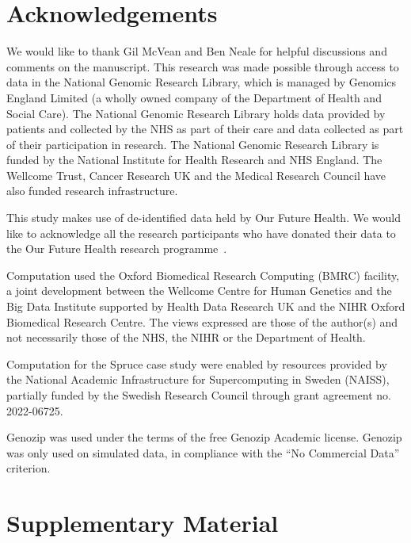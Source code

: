 \documentclass[a4paper,num-refs]{oup-contemporary}
\begin{document}
\section{Acknowledgements}
We would like to thank Gil McVean and Ben Neale for helpful discussions and 
comments on the manuscript.
This research was made possible through access to data in the National Genomic
Research Library, which is managed by Genomics England Limited (a wholly owned
company of the Department of Health and Social Care). The National Genomic
Research Library holds data provided by patients and collected by the NHS as
part of their care and data collected as part of their participation in
research. The National Genomic Research Library is funded by the National
Institute for Health Research and NHS England. The Wellcome Trust, Cancer
Research UK and the Medical Research Council have also funded research
infrastructure.

This study makes use of de-identified data held by Our Future Health. 
We would like to acknowledge all the research participants who have donated 
their data to the Our Future Health research programme~\cite{ofhpubpolicy}.

Computation used the Oxford Biomedical Research Computing (BMRC) facility, a
joint development between the Wellcome Centre for Human Genetics and the Big
Data Institute supported by Health Data Research UK and the NIHR Oxford
Biomedical Research Centre. The views expressed are those of the author(s) and
not necessarily those of the NHS, the NIHR or the Department of Health.

Computation for the Spruce case study were enabled by resources
provided by the National Academic Infrastructure for Supercomputing in
Sweden (NAISS), partially funded by the Swedish Research Council
through grant agreement no. 2022-06725.

Genozip was used under the terms of the free Genozip Academic license.
Genozip was only used on simulated data, in compliance with
the ``No Commercial Data'' criterion.



\renewcommand\thefigure{S\arabic{figure}}
\setcounter{figure}{0}
\renewcommand\thetable{S\arabic{table}}
\setcounter{table}{0}

\section*{Supplementary Material}
\end{document}
